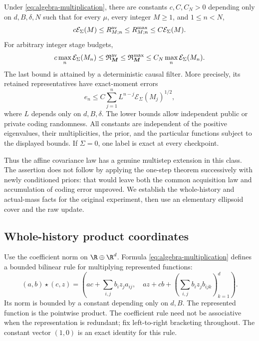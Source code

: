 \begin{theorem}
\label{thm:algebra-multistep}
Under \eqref{eq:algebra-multiplication}, there are constants $c,C,C_N>0$
depending only on $d,B,\delta,N$ such that for every $\mu$, every
integer $M\ge1$, and $1\le n<N$,
\begin{equation}\label{eq:algebra-checkpoint-law}
 c\mathcal E_\Sigma(M)\le R^{\rm av}_{M;n}
 \le R^{\rm max}_{M;n}\le C\mathcal E_\Sigma(M).
\end{equation}
For arbitrary integer stage budgets,
\begin{equation}\label{eq:algebra-causal-law}
 c\max_n\mathcal E_\Sigma(M_n)
 \le\mathfrak R^{\rm av}_{\boldsymbol M}
 \le\mathfrak R^{\rm max}_{\boldsymbol M}
 \le C_N\max_n\mathcal E_\Sigma(M_n).
\end{equation}
The last bound is attained by a deterministic causal filter. More
precisely, its retained representatives have exact-moment errors
\begin{equation}\label{eq:algebra-accumulation}
 e_n\le C\sum_{j=1}^n L^{n-j}\mathcal E_\Sigma(M_j)^{1/2},
\end{equation}
where $L$ depends only on $d,B,\delta$. The lower bounds allow independent
public or private coding randomness. All constants are independent of
the positive eigenvalues, their multiplicities, the prior, and the
particular functions subject to the displayed bounds. If $\Sigma=0$,
one label is exact at every checkpoint.
\end{theorem}

Thus the affine covariance law has a genuine multistep extension in this
class. The assertion does not follow by applying the one-step theorem
successively with newly conditioned priors: that would leave both the
common acquisition law and accumulation of coding error unproved.
We establish the whole-history and actual-mass facts for the original
experiment, then use an elementary ellipsoid cover and the raw update.

\subsection{Whole-history product coordinates}
Use the coefficient norm on $\R\oplus\R^d$. Formula
\eqref{eq:algebra-multiplication} defines a bounded bilinear rule for
multiplying represented functions:
\[
 (a,b)\star(c,z)=\left(ac+\sum_{i,j}b_i z_j a_{ij},\quad
             az+cb+\left(\sum_{i,j}b_i z_j b_{ijk}\right)_{k=1}^d\right).
\]
Its norm is bounded by a constant depending only on $d,B$.
The represented function is the pointwise product. The coefficient rule
need not be associative when the representation is redundant; fix
left-to-right bracketing throughout. The constant vector $(1,0)$ is
an exact identity for this rule.

